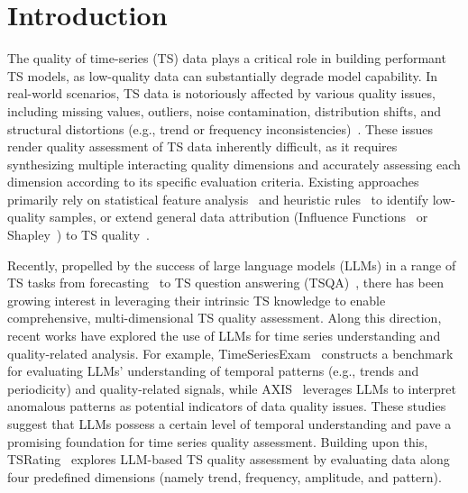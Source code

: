 \documentclass{article}
\begin{document}
\section{Introduction}
\label{intro}
The quality of time-series (TS) data plays a critical role in building performant TS models, as low-quality data can substantially degrade model capability.  In real-world scenarios, TS data is notoriously affected by various quality issues, including missing values, outliers, noise contamination, distribution shifts, and structural distortions (e.g., trend or frequency inconsistencies)~\citep{fang2024bayotide,zhang2024irregular,liu2024time}. These issues render quality assessment of TS data inherently difficult, as it requires synthesizing multiple interacting quality dimensions and accurately assessing each dimension according to its specific evaluation criteria.
Existing approaches primarily rely on statistical feature analysis~\citep{jadidi2023correlation} and heuristic rules~\citep{rahm2000data} to identify low-quality samples, or extend general data attribution (Influence Functions~\citep{hampel1974influence} or Shapley~\citep{shapley1953value}) to TS quality~\citep{zhang2025timeinf,bento2021timeshap}.

Recently, propelled by the success of large language models (LLMs) in a range of TS tasks from forecasting~\citep{liu2024lstprompt,gruver2023large} to TS question answering (TSQA)~\citep{kong2025time,guan2025timeomni,langer2025opentslm}, there has been growing interest in leveraging their intrinsic TS knowledge to enable comprehensive, multi-dimensional TS quality assessment.
Along this direction, recent works have explored the use of LLMs for time series understanding and quality-related analysis. For example, TimeSeriesExam~\citep{cai2024timeseriesexam} constructs a benchmark for evaluating LLMs' understanding of temporal patterns (e.g., trends and periodicity) and quality-related signals, while AXIS~\citep{lan2025axis} leverages LLMs to interpret anomalous patterns as potential indicators of data quality issues. These studies suggest that LLMs possess a certain level of temporal understanding and pave a promising foundation for time series quality assessment. Building upon this, TSRating~\citep{wu2026rating} explores LLM-based TS quality assessment by evaluating data along four predefined dimensions (namely trend, frequency, amplitude, and pattern).
\end{document}
